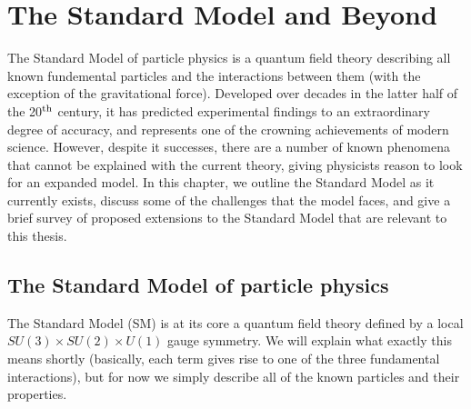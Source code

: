 \chapter{The Standard Model and Beyond}
\label{chap:theory}

The Standard Model of particle physics is a quantum field theory describing all
known fundemental particles and the interactions between them (with the exception
of the gravitational force). Developed over decades in the latter half of the 20$^{\mathrm{th}}$
century, it has predicted experimental findings to an extraordinary degree of accuracy,
and represents one of the crowning achievements of modern science.
However, despite it successes, there are a number of known phenomena that cannot be
explained with the current theory, giving physicists reason to look for an expanded model.
In this chapter, we outline the Standard Model as it currently exists, discuss some
of the challenges that the model faces, and give a brief survey of proposed extensions to
the Standard Model that are relevant to this thesis.


\section{The Standard Model of particle physics}

The Standard Model (SM) is at its core a quantum field theory defined by a local 
$SU(3)\times SU(2)\times U(1)$ gauge symmetry. We will explain what exactly this means shortly 
(basically, each term gives rise to one of the three fundamental interactions), but for now we simply
describe all of the known particles and their properties.

